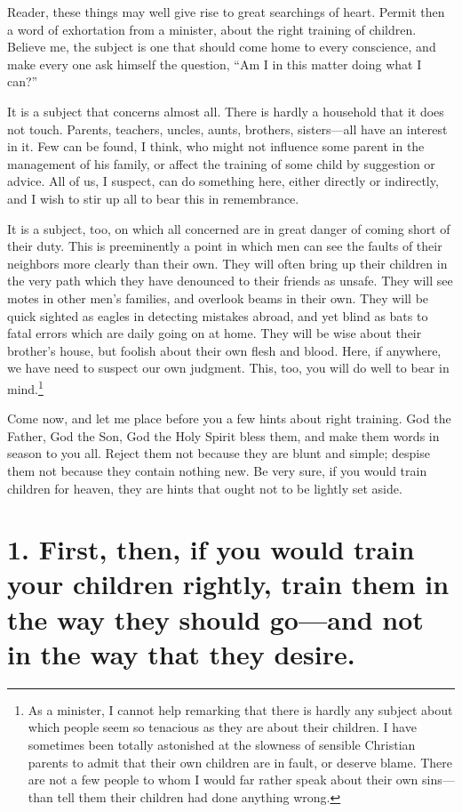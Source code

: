 \documentclass[
]{book}
\begin{document}
Reader, these things may well give rise to great searchings of heart. Permit then a word of exhortation from a minister, about the right training of children. Believe me, the subject is one that should come home to every conscience, and make every one ask himself the question, ``Am I in this matter doing what I can?''

It is a subject that concerns almost all. There is hardly a household that it does not touch. Parents, teachers, uncles, aunts, brothers, sisters---all have an interest in it. Few can be found, I think, who might not influence some parent in the management of his family, or affect the training of some child by suggestion or advice. All of us, I suspect, can do something here, either directly or indirectly, and I wish to stir up all to bear this in remembrance.

It is a subject, too, on which all concerned are in great danger of coming short of their duty. This is preeminently a point in which men can see the faults of their neighbors more clearly than their own. They will often bring up their children in the very path which they have denounced to their friends as unsafe. They will see motes in other men's families, and overlook beams in their own. They will be quick sighted as eagles in detecting mistakes abroad, and yet blind as bats to fatal errors which are daily going on at home. They will be wise about their brother's house, but foolish about their own flesh and blood. Here, if anywhere, we have need to suspect our own judgment. This, too, you will do well to bear in mind.\footnote{As a minister, I cannot help remarking that there is hardly any subject about which people seem so tenacious as they are about their children. I have sometimes been totally astonished at the slowness of sensible Christian parents to admit that their own children are in fault, or deserve blame. There are not a few people to whom I would far rather speak about their own sins---than tell them their children had done anything wrong.}

Come now, and let me place before you a few hints about right training. God the Father, God the Son, God the Holy Spirit bless them, and make them words in season to you all. Reject them not because they are blunt and simple; despise them not because they contain nothing new. Be very sure, if you would train children for heaven, they are hints that ought not to be lightly set aside.

\hypertarget{first-then-if-you-would-train-your-children-rightly-train-them-in-the-way-they-should-goand-not-in-the-way-that-they-desire.}{%
\section*{1. First, then, if you would train your children rightly, train them in the way they should go---and not in the way that they desire.}\label{first-then-if-you-would-train-your-children-rightly-train-them-in-the-way-they-should-goand-not-in-the-way-that-they-desire.}}
\end{document}
